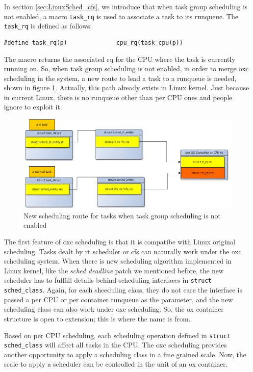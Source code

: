 In section \ref{sec:LinuxSched_cfs}, we introduce that when task group
scheduling is not enabled, a macro \texttt{task\_rq} is used to associate
a task to its runqueue. The \texttt{task\_rq} is defined as follows:
\begin{lstlisting}
#define task_rq(p)              cpu_rq(task_cpu(p))
\end{lstlisting}
The macro returns the associated rq for the CPU where the task is currently 
running on. So, when task group scheduling is not enabled, in order to merge
oxc scheduling in the system, a new route to lead a task to a runqueue is 
needed, shown in figure \ref{fig:oxc_task_no_tg}. Actually, this path already 
exists in Linux kernel. Just because in current Linux, there is no runqueue 
other than per CPU ones and people ignore to exploit it.  
\begin{figure}[htbp]
        \centering
        \includegraphics[width=\textwidth]{images/oxc_task_no_tg}
        \caption{New scheduling route for tasks when task group scheduling is not enabled}
        \label{fig:oxc_task_no_tg}
\end{figure}

The first feature of oxc scheduling is that it is compatibe with Linux original
scheduling. Tasks dealt by rt scheduler or cfs can naturally work under the
oxc scheduling system. When there is new scheduling algorithm implemented in
Linux kernel, like the \emph{sched deadline} patch we mentioned before, the
new scheduler has to fullfill details behind scheduling interfaces in 
\texttt{struct sched\_class}. Again, for each shceduling class, they do not
care the interface is passed a per CPU or per container runqueue as the
parameter, and the new scheduling class can also work under oxc scheduling.
So, the ox container structure is open to extension; this is where the name
is from.

Based on per CPU scheduling, each scheduling operation defined in 
\texttt{struct sched\_class} will affect all tasks in the CPU. The
oxc scheduling provides another opportunity to apply a scheduling class in a 
fine grained scale. Now, the scale to apply a scheduler can be controlled 
in the unit of an ox container. 

